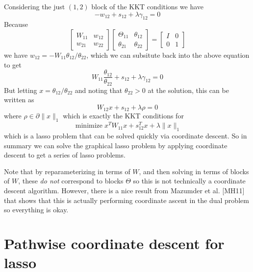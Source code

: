 \documentclass[twoside]{article}
\renewcommand{\cite}[1]{[#1]}
\DeclareMathOperator*{\minimize}{minimize}
\begin{document}
Considering the just $(1,2)$ block of the KKT conditions we have
\begin{equation*}
-w_{12} + s_{12} + \lambda\gamma_{12} = 0
\end{equation*}
Because
\begin{equation*}
\left[ \begin{array}{ll} W_{11} & w_{12} \\ w_{21} & w_{22} \end{array} \right]\left[ \begin{array}{ll} \Theta_{11} & \theta_{12} \\ \theta_{21} & \theta_{22} \end{array} \right] = 
\left[ \begin{array}{ll} I & 0 \\ 0 & 1 \end{array} \right]
\end{equation*}
we have $w_{12} = -W_{11}\theta_{12}/\theta_{22}$, which we can subsitute back into the above equation to get
\begin{equation*}
W_{11}\frac{\theta_{12}}{\theta_{22}} + s_{12} + \lambda\gamma_{12} = 0
\end{equation*}
But letting $x = \theta_{12}/\theta_{22}$ and noting that $\theta_{22} > 0$ at the solution, this can be written as 
\begin{equation*}
W_{12}x + s_{12} + \lambda \rho = 0
\end{equation*}
where $\rho \in \partial \|x \|_1$ which is exactly the KKT conditions for
\begin{equation*}
\minimize x^TW_{11}x + s_{12}^Tx + \lambda \|x\|_1
\end{equation*}
which is a lasso problem that can be solved quickly via coordinate descent. So in summary we can solve the graphical lasso problem by applying coordinate descent to get a series of lasso problems.

Note that by reparameterizing in terms of $W$, and then solving in terms of blocks of $W$, these \emph{do not} correspond to blocks $\Theta$ so this is not technically a coordinate descent algorithm. However, there is a nice result from Mazumder et al. \cite{MH11} that shows that this is actually performing coordinate ascent in the dual problem so everything is okay.

\section{Pathwise coordinate descent for lasso}
\end{document}
